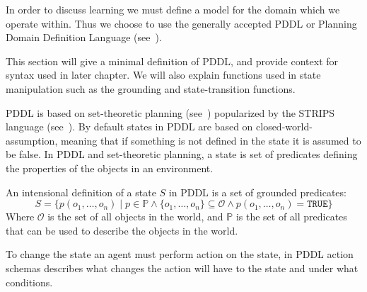 \documentclass[../Master.tex]{subfiles}
\begin{document}
In order to discuss learning we must define a model for the domain which we operate within. Thus we choose to use the generally accepted PDDL or Planning Domain Definition Language (see~\cite{PDDL}). 

This section will give a minimal definition of PDDL, and provide context for syntax used in later chapter. We will also explain functions used in state manipulation such as the grounding and state-transition functions.


PDDL is based on set-theoretic planning (see~\cite{ghallab2004a}) popularized by the STRIPS language (see~\cite{STRIPS}). By default states in PDDL are based on closed-world-assumption, meaning that if something is not defined in the state it is assumed to be false. 
In PDDL and set-theoretic planning, a state is set of predicates defining the properties of the objects in an environment.

\begin{definition} 
	An intensional definition of a state $S$ in PDDL is a set of grounded predicates:
    \begin{equation*}
        S=\{p(o_1,\dots,o_n) \mid  p \in \mathbb{P} \land \{o_1,\dots,o_n\} \subseteq \mathcal{O} \land p(o_1,\dots,o_n) = \texttt{TRUE}\}
    \end{equation*}
    Where $\mathcal{O}$ is the set of all objects in the world, and $\mathbb{P}$ is the set of all predicates that can be used to describe the objects in the world.
\end{definition}

To change the state an agent must perform action on the state, in PDDL action schemas describes what changes the action will have to the state and under what conditions. 
	
\end{document}
